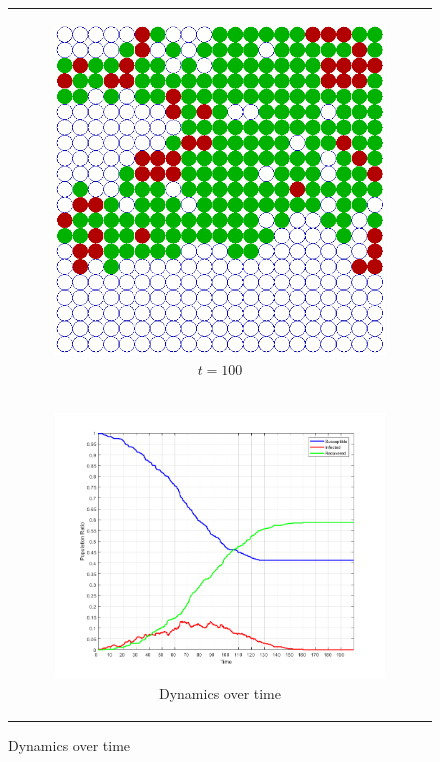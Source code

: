 \begin{figure}
\begin{center}
	\begin{tabular}{c}
		\begin{subfigure}[b]{0.3\textwidth}
			\centering
			\includegraphics[width=1\textwidth, angle=0]{./fig/step5_environment/SIR_environment_30x30agents_t100_01dt.png}
			\caption{$t = 100$}
			\label{fig:sir_env_t100}
		\end{subfigure}
    	
    	\\
  
		\begin{subfigure}[b]{0.38\textwidth}
			\centering
			\includegraphics[width=1\textwidth, angle=0]{./fig/step5_environment/SIR_dynamics_30x30agents_300t_01dt.png}
			\caption{Dynamics over time}
			\label{fig:sir_dynamics_30x30agents_300t_01dt}
		\end{subfigure}
	\end{tabular}
	

\end{center}
\end{figure}
